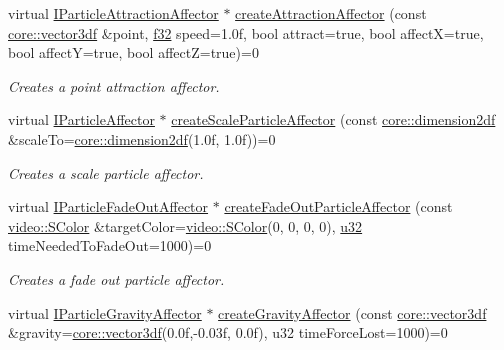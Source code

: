 \begin{DoxyCompactItemize}
virtual \hyperlink{classirr_1_1scene_1_1IParticleAttractionAffector}{I\+Particle\+Attraction\+Affector} $\ast$ \hyperlink{classirr_1_1scene_1_1IParticleSystemSceneNode_a833def146fb8b3d79bbbfbf69a9ed963}{create\+Attraction\+Affector} (const \hyperlink{namespaceirr_1_1core_a06f169d08b5c429f5575acb7edbad811}{core\+::vector3df} \&point, \hyperlink{namespaceirr_a0277be98d67dc26ff93b1a6a1d086b07}{f32} speed=1.\+0f, bool attract=true, bool affect\+X=true, bool affect\+Y=true, bool affect\+Z=true)=0
\begin{DoxyCompactList}\small\item\em Creates a point attraction affector. \end{DoxyCompactList}\item 
virtual \hyperlink{classirr_1_1scene_1_1IParticleAffector}{I\+Particle\+Affector} $\ast$ \hyperlink{classirr_1_1scene_1_1IParticleSystemSceneNode_a015692bb57e0b6dfff1de96975b3bc74}{create\+Scale\+Particle\+Affector} (const \hyperlink{namespaceirr_1_1core_af6dc5c45ff13e7712758c827ff58676b}{core\+::dimension2df} \&scale\+To=\hyperlink{namespaceirr_1_1core_af6dc5c45ff13e7712758c827ff58676b}{core\+::dimension2df}(1.\+0f, 1.\+0f))=0
\begin{DoxyCompactList}\small\item\em Creates a scale particle affector. \end{DoxyCompactList}\item 
virtual \hyperlink{classirr_1_1scene_1_1IParticleFadeOutAffector}{I\+Particle\+Fade\+Out\+Affector} $\ast$ \hyperlink{classirr_1_1scene_1_1IParticleSystemSceneNode_a4a9c3ecdf6118267f312f9389bb24888}{create\+Fade\+Out\+Particle\+Affector} (const \hyperlink{classirr_1_1video_1_1SColor}{video\+::\+S\+Color} \&target\+Color=\hyperlink{classirr_1_1video_1_1SColor}{video\+::\+S\+Color}(0, 0, 0, 0), \hyperlink{namespaceirr_a0416a53257075833e7002efd0a18e804}{u32} time\+Needed\+To\+Fade\+Out=1000)=0
\begin{DoxyCompactList}\small\item\em Creates a fade out particle affector. \end{DoxyCompactList}\item 
virtual \hyperlink{classirr_1_1scene_1_1IParticleGravityAffector}{I\+Particle\+Gravity\+Affector} $\ast$ \hyperlink{classirr_1_1scene_1_1IParticleSystemSceneNode_af06d3565f9c352bdcdf68bb2e3797c32}{create\+Gravity\+Affector} (const \hyperlink{namespaceirr_1_1core_a06f169d08b5c429f5575acb7edbad811}{core\+::vector3df} \&gravity=\hyperlink{namespaceirr_1_1core_a06f169d08b5c429f5575acb7edbad811}{core\+::vector3df}(0.\+0f,-\/0.\+03f, 0.\+0f), u32 time\+Force\+Lost=1000)=0

\end{DoxyCompactItemize}

